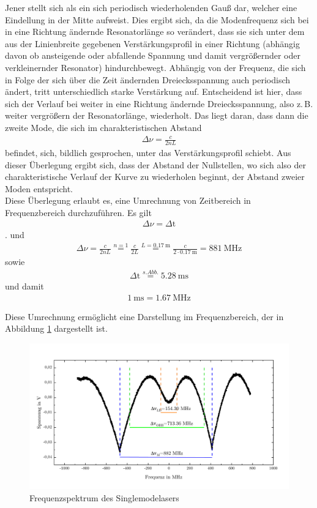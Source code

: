 \documentclass[a4paper,twoside,final]{article}
\begin{document}
Jener stellt sich als ein sich periodisch wiederholenden Gauß dar, welcher eine Eindellung in der Mitte aufweist. Dies ergibt sich, da die Modenfrequenz sich bei in eine Richtung ändernde Resonatorlänge so verändert, dass sie sich unter dem aus der Linienbreite gegebenen Verstärkungsprofil \glqq in einer Richtung (abhängig davon ob ansteigende oder abfallende Spannung und damit vergrößernder oder verkleinernder Resonator) hindurchbewegt\grqq. Abhängig von der Frequenz, die sich in Folge der sich über die Zeit ändernden Dreiecksspannung auch periodisch ändert, tritt unterschiedlich starke Verstärkung auf. Entscheidend ist hier, dass sich der Verlauf bei weiter in eine Richtung ändernde Dreiecksspannung, also z.\,B. weiter vergrößern der Resonatorlänge, wiederholt. Das liegt daran, dass dann die zweite Mode, die sich im charakteristischen Abstand
\begin{align}
  \Delta \nu = \frac{c}{2nL}
\end{align}
befindet, sich, bildlich gesprochen, unter das Verstärkungsprofil schiebt. Aus dieser Überlegung ergibt sich, dass der Abstand der Nullstellen, wo sich also der charakteristische Verlauf der Kurve zu wiederholen beginnt, der Abstand zweier Moden entspricht.\\
Diese Überlegung erlaubt es, eine Umrechnung von Zeitbereich in Frequenzbereich durchzuführen. Es gilt
\begin{align}
  \Delta \nu = \Delta \text{t}
\end{align}.
und
\begin{align}
  \Delta \nu = \frac{c}{2nL} \overset{n=1}{=} \frac{c}{2L} \overset{L=\SI{0,17}{\meter}}{=} \frac{c}{2\cdot \SI{0,17}{\meter}}=\SI{881}{\mega\hertz}
\end{align}
sowie
\begin{align}
  \Delta \text{t} \overset{s. Abb.}=\SI{5,28}{\milli\second}
\end{align}
und damit
\begin{align}
  \SI{1}{\milli\second}=\SI{1,67}{\mega\hertz}
\end{align}

Diese Umrechnung ermöglicht eine Darstellung im Frequenzbereich, der in Abbildung \ref{fig:Frequenzverlauf} dargestellt ist.

\begin{figure}[htp]
    \centering
        \includegraphics[width=1\textwidth]{Bilder/Profil_SML_Frequenzbild.pdf}
    \caption{Frequenzspektrum des Singlemodelasers}
    \label{fig:Frequenzverlauf}
\end{figure}
\end{document}
